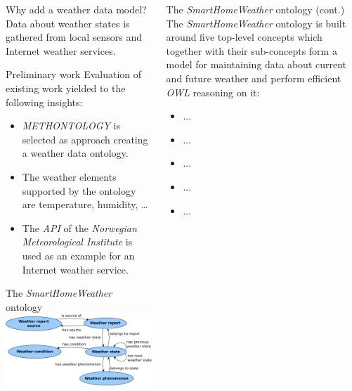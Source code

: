 \documentclass[final,hyperref={pdfpagelabels=true}]{beamer}
\begin{document}
\begin{frame}[fragile]
\begin{columns}[t]
\begin{column}{.45\textwidth}
\begin{block}{Why add a weather data model?}
	Data about weather states is gathered from local sensors and Internet weather services.
      \end{block}

      \begin{block}{Preliminary work}
	Evaluation of existing work yielded to the following insights: %
	\begin{itemize}
	  \item \emph{METHONTOLOGY} is selected as approach creating a weather data ontology.
	  \item The weather elements supported by the ontology are temperature, humidity, … %
	  \item The \emph{API} of the \emph{Norwegian Meteorological Institute} is used as an example for an Internet weather service.
	\end{itemize}
      \end{block}

      \begin{block}{The \emph{SmartHomeWeather} ontology}
	\includegraphics[width=\textwidth]{figures/binary-relations.pdf}
      \end{block}
    \end{column}

    \begin{column}{.45\textwidth}
      \begin{block}{The \emph{SmartHomeWeather} ontology (cont.)}
	The \emph{SmartHomeWeather} ontology is built around five top-level concepts which together with their sub-concepts form a model for maintaining data about current and future weather and perform efficient \emph{OWL} reasoning on it:
	\begin{itemize}
          \item ...
          \item ...
          \item ...
          \item ...
          \item ...
	\end{itemize}


\end{block}
\end{column}
\end{columns}
\end{frame}
\end{document}
